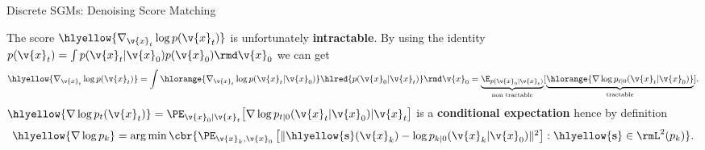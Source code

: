 \begin{frame}{Discrete SGMs: Denoising Score Matching \cite{vincent2011connection}}

The score $ \hlyellow{\nabla_{\v{x}_t} \log p(\v{x}_t)} $ is unfortunately \textbf{intractable}. By using the identity $p(\v{x}_t) = \int p(\v{x}_t | \v{x}_0) p(\v{x}_0) \rmd \v{x}_0$ we can get~\cite{efron2011tweedie} 
\begin{equation*}
    \hlyellow{\nabla_{\v{x}_t} \log p(\v{x}_t)} 
    = \int \hlorange{\nabla_{\v{x}_t} \log p(\v{x}_t|\v{x}_0)} \hlred{p(\v{x}_0|\v{x}_t)} \rmd \v{x}_0
    = \underbrace{\E_{p(\v{x}_0 | \v{x}_t)}}_{\text{non tractable}}[\underbrace{\hlorange{\nabla \log p_{t|0}(\v{x}_t|\v{x}_0)}}_{\text{tractable}}].
\end{equation*}
\pause
$\hlyellow{\nabla \log p_t(\v{x}_t)} = \PE_{\v{x}_0 | \v{x}_t}{\left[\nabla  \log p_{t|0}(\v{x}_t|\v{x}_0) |\v{x}_t \right]}$ is a \textbf{conditional expectation} hence by definition%
\begin{equation}
\textstyle{
    \hlyellow{\nabla \log p_k} 
    = \arg \min \cbr{ \PE_{\v{x}_k,\v{x}_0} \left[ \| \hlyellow{\mathbf{s}}(\v{x}_k) - \log p_{k|0}(\v{x}_k|\v{x}_0) \|^2 \right] : \hlyellow{\mathbf{s}} \in \rmL^2(p_k)}.
}    
\end{equation}
%


\end{frame}
